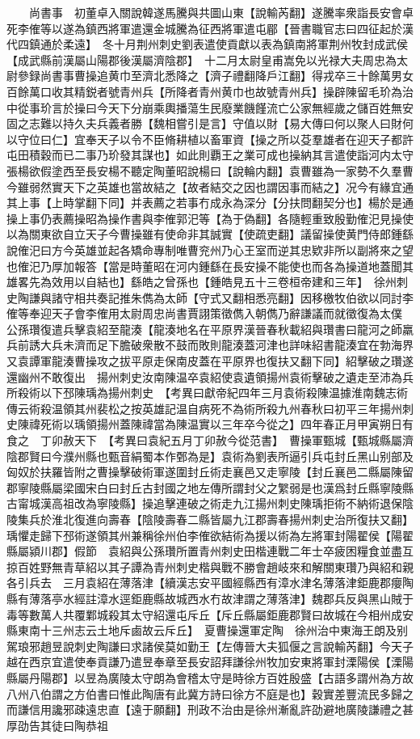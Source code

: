 　　尚書事　初董卓入關說韓遂馬騰與共圖山東【說輸芮翻】遂騰率衆詣長安會卓死李傕等以遂為鎮西將軍遣還金城騰為征西將軍遣屯郿【晉書職官志曰四征起於漢代四鎮通於柔遠】　冬十月荆州刺史劉表遣使貢獻以表為鎮南將軍荆州牧封成武侯【成武縣前漢屬山陽郡後漢屬濟陰郡】　十二月太尉皇甫嵩免以光禄大夫周忠為太尉參録尚書事曹操追黄巾至濟北悉降之【濟子禮翻降戶江翻】得戎卒三十餘萬男女百餘萬口收其精鋭者號青州兵【所降者青州黄巾也故號青州兵】操辟陳留毛玠為治中從事玠言於操曰今天下分崩乘輿播蕩生民廢業饑饉流亡公家無經歲之儲百姓無安固之志難以持久夫兵義者勝【魏相嘗引是言】守值以財【易大傳曰何以聚人曰財何以守位曰仁】宜奉天子以令不臣脩耕植以畜軍資【操之所以芟羣雄者在迎天子都許屯田積穀而已二事乃玠發其謀也】如此則覇王之業可成也操納其言遣使詣河内太守張楊欲假塗西至長安楊不聽定陶董昭說楊曰【說輪内翻】袁曹雖為一家勢不久羣曹今雖弱然實天下之英雄也當故結之【故者結交之因也謂因事而結之】况今有緣宜通其上事【上時掌翻下同】并表薦之若事冇成永為深分【分扶問翻契分也】楊於是通操上事仍表薦操昭為操作書與李傕郭汜等【為于偽翻】各隨輕重致殷勤傕汜見操使以為關東欲自立天子今曹操雖有使命非其誠實【使疏吏翻】議留操使黄門侍郎鍾繇說傕汜曰方今英雄並起各矯命專制唯曹兖州乃心王室而逆其忠欵非所以副將來之望也傕汜乃厚加報答【當是時董昭在河内鍾繇在長安操不能使也而各為操道地蓋聞其雄畧先為效用以自結也】繇皓之曾孫也【鍾皓見五十三卷桓帝建和三年】　徐州刺史陶謙與諸守相共奏記推朱儁為太師【守式又翻相悉亮翻】因移檄牧伯欲以同討李傕等奉迎天子會李傕用太尉周忠尚書賈詡策徵儁入朝儁乃辭謙議而就徵復為太僕　公孫瓚復遣兵擊袁紹至龍湊【龍湊地名在平原界漢晉春秋載紹與瓚書曰龍河之師羸兵前誘大兵未濟而足下膽破衆散不鼓而敗則龍湊蓋河津也詳味紹書龍湊宜在勃海界又袁譚軍龍湊曹操攻之拔平原走保南皮蓋在平原界也復扶又翻下同】紹擊破之瓚遂還幽州不敢復出　揚州刺史汝南陳温卒袁紹使袁遺領揚州袁術擊破之遺走至沛為兵所殺術以下邳陳瑀為揚州刺史　【考異曰獻帝紀四年三月袁術殺陳温據淮南魏志術傳云術殺温領其州裴松之按英雄記温自病死不為術所殺九州春秋曰初平三年揚州刺史陳禕死術以瑀領揚州蓋陳禕當為陳温實以三年卒今從之】四年春正月甲寅朔日有食之　丁卯赦天下　【考異曰袁紀五月丁卯赦今從范書】　曹操軍甄城【甄城縣屬濟陰郡賢曰今濮州縣也甄音絹蜀本作鄄為是】袁術為劉表所逼引兵屯封丘黑山别部及匈奴於扶羅皆附之曹操擊破術軍遂圍封丘術走襄邑又走寧陵【封丘襄邑二縣屬陳留郡寧陵縣屬梁國宋白曰封丘古封國之地左傳所謂封父之䌓弱是也漢爲封丘縣寧陵縣古甯城漢高祖改為寧陵縣】操追擊連破之術走九江揚州刺史陳瑀拒術不納術退保陰陵集兵於淮北復進向壽春【陰陵壽春二縣皆屬九江郡壽春揚州刺史治所復扶又翻】瑀懼走歸下邳術遂領其州兼稱徐州伯李傕欲結術為援以術為左將軍封陽翟侯【陽翟縣屬潁川郡】假節　袁紹與公孫瓚所置青州刺史田楷連戰二年士卒疲困糧食並盡互掠百姓野無青草紹以其子譚為青州刺史楷與戰不勝會趙岐來和解關東瓚乃與紹和親各引兵去　三月袁紹在薄落津【續漢志安平國經縣西有漳水津名薄落津鉅鹿郡癭陶縣有薄落亭水經註漳水逕鉅鹿縣故城西水冇故津謂之薄落津】魏郡兵反與黑山賊于毒等數萬人共覆鄴城殺其太守紹還屯斥丘【斥丘縣屬鉅鹿郡賢曰故城在今相州成安縣東南十三州志云土地斥鹵故云斥丘】　夏曹操還軍定陶　徐州治中東海王朗及别駕琅邪趙昱說刺史陶謙曰求諸侯莫如勤王【左傳晉大夫狐偃之言說輸芮翻】今天子越在西京宜遣使奉貢謙乃遣昱奉章至長安詔拜謙徐州牧加安東將軍封溧陽侯【溧陽縣屬丹陽郡】以昱為廣陵太守朗為會稽太守是時徐方百姓殷盛【古語多謂州為方故八州八伯謂之方伯書曰惟此陶唐有此冀方詩曰徐方不庭是也】穀實差豐流民多歸之而謙信用讒邪疎遠忠直【遠于願翻】刑政不治由是徐州漸亂許劭避地廣陵謙禮之甚厚劭告其徒曰陶恭祖